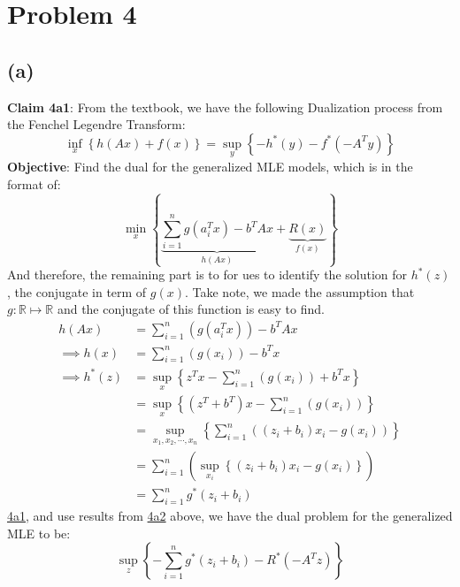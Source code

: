 \documentclass[]{article}
\begin{document}
\section*{Problem 4}
    \subsection*{(a)}
        \textbf{Claim 4a1\label{4a1}}: From the textbook, we have the following Dualization process from the Fenchel Legendre Transform: 
        $$
        \inf_x \left\lbrace
            h(Ax) + f(x)
        \right\rbrace = 
        \sup_y \left\lbrace
            -h^*(y) - f^*(-A^Ty)
        \right\rbrace
        $$
        \textbf{Objective}: Find the dual for the generalized MLE models, which is in the format of: 
        $$
        \min_x \left\lbrace
            \underbrace{\sum_{i = 1}^n g(a_i^T x) - b^TAx}_{h(Ax)}
             + \underbrace{R(x)}_{f(x)}
        \right\rbrace
        $$
        And therefore, the remaining part is to for ues to identify the solution for $h^*(z)$, the conjugate in term of $g(x)$. Take note, we made the assumption that $g: \mathbb{R} \mapsto \mathbb{R}$ and the conjugate of this function is easy to find. 
        \begin{align*}\tag{4a2}\label{eqn:4a2}
            h(Ax) &= \sum_{i = 1}^{n}\left(
                g(a_i^Tx)
            \right) - b^TAx
            \\
            \implies 
            h(x) &= \sum_{i = 1}^{n}\left(
                g(x_i)
            \right) - b^Tx
            \\
            \implies
            h^*(z) &= 
            \sup_x \left\lbrace
                z^Tx  - \sum_{i=1}^{n}\left(g(x_i)\right) + b^Tx
            \right\rbrace
            \\
            &= 
            \sup_x \left\lbrace
                (z^T + b^T)x  - \sum_{i=1}^{n}\left(g(x_i)\right)
            \right\rbrace
            \\
            &= 
            \sup_{x_1, x_2, \cdots, x_n} \left\lbrace
                \sum_{i=1}^{n}\left(
                    (z_i + b_i)x_i  - g(x_i)\right)
            \right\rbrace
            \\
            &= 
            \sum_{i=1}^{n}\left(
                    \sup_{x_i}
                    \left\lbrace
                        (z_i + b_i)x_i  - g(x_i)    
                    \right\rbrace
                \right)
            \\
            &= 
            \sum_{i = 1}^n g^*(z_i + b_i)
        \end{align*}
        \hyperref[4a1]{4a1}, and use results from \hyperref[eqn:4a2]{4a2} above, we have the dual problem for the generalized MLE to be: 
        \begin{equation*}\tag{4a3}\label{eqn:4a3}
            \sup_z \left\lbrace
                - \sum_{i = 1}^n g^*(z_i + b_i)
                - R^*(-A^Tz)
            \right\rbrace
        \end{equation*}
\end{document}
